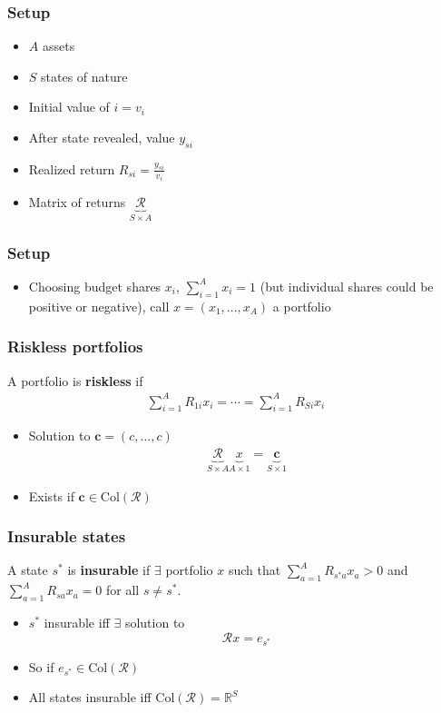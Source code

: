 \documentclass[compress]{beamer}
\def\R{\mathbb{R}}
\newcommand{\col}{\mathrm{Col}}
\begin{document}
\begin{frame}
  \frametitle{Setup}
  \begin{itemize}
  \item $A$ assets
  \item $S$ states of nature
  \item Initial value of $i = v_i$
  \item After state revealed, value $y_{si}$
  \item Realized return $R_{si} = \frac{y_{si}}{v_i}$
  \item Matrix of returns $\underbrace{\mathcal{R}}_{S \times A}$
  \end{itemize}
\end{frame}

\begin{frame}
  \frametitle{Setup}
  \begin{itemize}
  \item Choosing budget shares $x_i$, $\sum_{i=1}^A x_i = 1$ (but
    individual shares could be positive or negative), call $x =
    (x_1,...,x_A)$ a portfolio
  \end{itemize}
\end{frame}

\begin{frame} \frametitle{Riskless portfolios}
  \begin{definition}
    A portfolio is \textbf{riskless} if 
    \begin{align*}
      \sum_{i=1}^A R_{1i} x_i  =  \cdots   =\sum_{i=1}^A R_{Si} x_i 
    \end{align*}
  \end{definition}
  \begin{itemize}
  \item Solution to $\mathbf{c} = (c, ..., c)$
    \begin{align*}
      \underbrace{\mathcal{R}}_{S \times A} \underbrace{x}_{A \times 1} =
      \underbrace{\mathbf{c}}_{S \times 1}
    \end{align*}
  \item Exists if $\mathbf{c} \in \col(\mathcal{R})$
  \end{itemize}
\end{frame}

\begin{frame}\frametitle{Insurable states}
  \begin{definition}
    A state $s^*$ is \textbf{insurable} if $\exists$ portfolio $x$ such
    that $\sum_{a=1}^A R_{s^*a} x_a > 0$ and $\sum_{a=1}^A R_{sa} x_a =
    0$ for all $s \neq s^*$. 
  \end{definition}
  \begin{itemize}
  \item $s^*$ insurable iff $\exists$ solution to
    \[ \mathcal{R}x = e_{s^*} \] 
  \item So if $e_{s^*} \in \col(\mathcal{R})$
  \item All states insurable iff $\col(\mathcal{R}) = \R^S$
  \end{itemize}
\end{frame}
\end{document}
